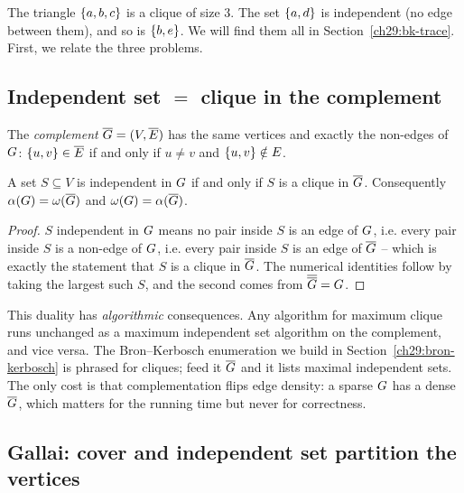 The triangle $\{a,b,c\}$ is a clique of size $3$. The set $\{a,d\}$ is
independent (no edge between them), and so is $\{b,e\}$. We will find them all in Section~\ref{ch29:bk-trace}. First, we relate the three problems.

\subsection{Independent set $=$ clique in the complement}

\begin{definition}
\label{ch29:def-complement}
The \emph{complement} $\overline{G}=(V,\overline{E})$ has the same vertices
and exactly the non-edges of $G$: $\{u,v\}\in\overline{E}$ if and only if
$u\neq v$ and $\{u,v\}\notin E$.
\end{definition}

\begin{proposition}
\label{ch29:prop-is-clique}
A set $S\subseteq V$ is independent in $G$ if and only if $S$ is a clique in
$\overline{G}$. Consequently $\alpha(G)=\omega(\overline{G})$ and
$\omega(G)=\alpha(\overline{G})$.
\end{proposition}

\begin{proof}
$S$ independent in $G$ means no pair inside $S$ is an edge of $G$, i.e.
every pair inside $S$ is a non-edge of $G$, i.e. every pair inside $S$ is an
edge of $\overline{G}$ -- which is exactly the statement that $S$ is a clique
in $\overline{G}$. The numerical identities follow by taking the largest such
$S$, and the second comes from $\overline{\overline{G}}=G$.
\end{proof}

This duality has \emph{algorithmic} consequences.
Any algorithm for maximum clique runs unchanged as a maximum independent set
algorithm on the complement, and vice versa. The Bron--Kerbosch enumeration we build in Section~\ref{ch29:bron-kerbosch} is phrased for cliques;
feed it $\overline{G}$ and it lists maximal independent sets. The only cost is
that complementation flips edge density: a sparse $G$ has a dense
$\overline{G}$, which matters for the running time but never for correctness.

\subsection{Gallai: cover and independent set partition the vertices}

